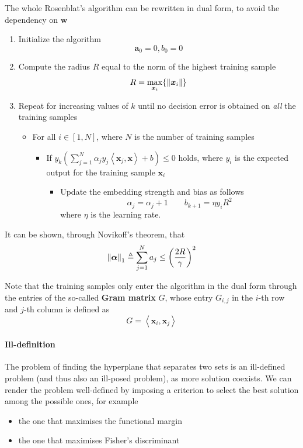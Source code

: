 \documentclass[oneside,onecolumn]{report}
\newcommand{\inp}[2]{\left\langle #1, #2 \right\rangle}
\begin{document}
The whole Rosenblat's algorithm can be rewritten in dual form, to avoid the dependency on $\bm w$
\begin{enumerate}
    \item Initialize the algorithm
    $$ \bm a_0 = 0, b_0 = 0 $$

    \item Compute the radius $R$ equal to the norm of the highest training sample
    $$ R = \max_{\bm x_i}\{\norm{\bm x_i}\} $$

    \item Repeat for increasing values of $k$ until no decision error is obtained on \emph{all} the training samples
    \begin{itemize}
        \item For all $i \in [1, N]$, where $N$ is the number of training samples
        \begin{itemize}[label=\textbullet]
            \item If $y_k \left( \sum_{j = 1}^N \alpha_j y_j \inp{\bm x_j}{\bm x} + b \right) \leq 0$ holds, where $y_i$ is the expected output for the training sample $\bm x_i$
            \begin{itemize}[label=\textbullet]
                \item Update the embedding strength and bias as follows
                $$ \alpha_j = \alpha_j + 1 \qquad b_{k + 1} = \eta y_i R^2 $$
                where $\eta$ is the learning rate.
            \end{itemize}
        \end{itemize}
    \end{itemize}
\end{enumerate}

It can be shown, through Novikoff's theorem, that
$$ \norm{\bm \alpha}_1 \triangleq \sum_{j = 1}^N a_j \leq \left( \frac{2 R}{\gamma} \right)^2 $$

Note that the training samples only enter the algorithm in the dual form through the entries of the so-called \textbf{Gram matrix} $G$, whose entry $G_{i, j}$ in the $i$-th row and $j$-th column is defined as
$$ G = \inp{\bm x_i}{\bm x_j} $$

\paragraph{Ill-definition}
The problem of finding the hyperplane that separates two sets is an ill-defined problem (and thus also an ill-posed problem), as more solution coexists.
We can render the problem well-defined by imposing a criterion to select the best solution among the possible ones, for example
\begin{itemize}
    \item the one that maximises the functional margin
    \item the one that maximises Fisher's discriminant
\end{itemize}
\end{document}
